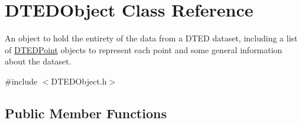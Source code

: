 \hypertarget{class_d_t_e_d_object}{
\section{DTEDObject Class Reference}
\label{class_d_t_e_d_object}
}


An object to hold the entirety of the data from a DTED dataset, including a list of \hyperlink{class_d_t_e_d_point}{DTEDPoint} objects to represent each point and some general information about the dataset.  




{\ttfamily \#include $<$DTEDObject.h$>$}

\subsection*{Public Member Functions}
